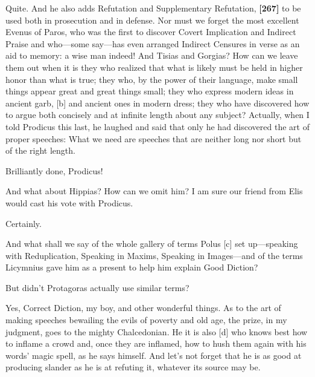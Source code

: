 \saysocrates Quite. And he also adds Refutation and Supplementary
Refutation, {\bf {[}267{]}} to be used both in prosecution and in
defense. Nor must we forget the most excellent Evenus of
Paros, who was the
first to discover Covert Implication and Indirect Praise and who---some
say---has even arranged Indirect Censures in verse as an aid to memory:
a wise man indeed! And
Tisias and Gorgias?
How can we leave them out when it is they who realized that what is
likely must be held in higher honor than what is true; they who, by the
power of their language, make small things appear great and great things
small; they who express modern ideas in ancient garb, {[}b{]} and
ancient ones in modern dress; they who have discovered how to argue both
concisely and at infinite length about any subject? Actually, when I
told Prodicus this
last, he laughed and said that only he had discovered the art of proper
speeches: What we need are speeches that are neither long nor short but
of the right length.

\sayphaedrus Brilliantly done, Prodicus!

\saysocrates And what about
Hippias? How can we
omit him? I am sure our friend from Elis would cast his vote with
Prodicus.

\sayphaedrus Certainly.

\saysocrates And what shall we say of the whole gallery of terms
Polus {[}c{]} set
up---speaking with Reduplication, Speaking in Maxims, Speaking in
Images---and of the terms Licymnius gave him as a present to help him
explain Good Diction?

\sayphaedrus But didn't Protagoras actually use similar
terms?

\saysocrates Yes, Correct Diction, my boy, and other wonderful things. As
to the art of making speeches bewailing the evils of poverty and old
age, the prize, in my judgment, goes to the mighty
Chalcedonian. He it is
also {[}d{]} who knows best how to inflame a crowd and, once they are
inflamed, how to hush them again with his words' magic spell, as he says
himself. And let's not forget that he is as good at producing slander as
he is at refuting it, whatever its source may be.

